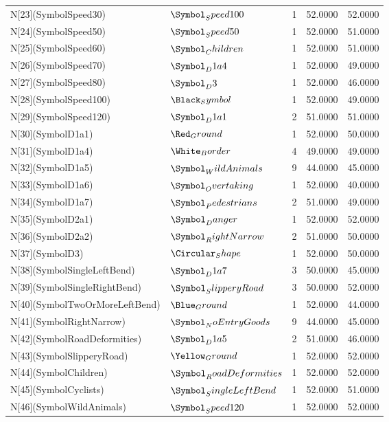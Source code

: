 \begin{tabular}{lllll}
N[23](SymbolSpeed30) & $\Symbol_Speed100$ & 1 & 52.0000 & 52.0000 \\
N[24](SymbolSpeed50) & $\Symbol_Speed50$ & 1 & 52.0000 & 51.0000 \\
N[25](SymbolSpeed60) & $\Symbol_Children$ & 1 & 52.0000 & 51.0000 \\
N[26](SymbolSpeed70) & $\Symbol_D1a4$ & 1 & 52.0000 & 49.0000 \\
N[27](SymbolSpeed80) & $\Symbol_D3$ & 1 & 52.0000 & 46.0000 \\
N[28](SymbolSpeed100) & $\Black_Symbol$ & 1 & 52.0000 & 49.0000 \\
N[29](SymbolSpeed120) & $\Symbol_D1a1$ & 2 & 51.0000 & 51.0000 \\
N[30](SymbolD1a1) & $\Red_Ground$ & 1 & 52.0000 & 50.0000 \\
N[31](SymbolD1a4) & $\White_Border$ & 4 & 49.0000 & 49.0000 \\
N[32](SymbolD1a5) & $\Symbol_WildAnimals$ & 9 & 44.0000 & 45.0000 \\
N[33](SymbolD1a6) & $\Symbol_Overtaking$ & 1 & 52.0000 & 40.0000 \\
N[34](SymbolD1a7) & $\Symbol_Pedestrians$ & 2 & 51.0000 & 49.0000 \\
N[35](SymbolD2a1) & $\Symbol_Danger$ & 1 & 52.0000 & 52.0000 \\
N[36](SymbolD2a2) & $\Symbol_RightNarrow$ & 2 & 51.0000 & 50.0000 \\
N[37](SymbolD3) & $\Circular_Shape$ & 1 & 52.0000 & 50.0000 \\
N[38](SymbolSingleLeftBend) & $\Symbol_D1a7$ & 3 & 50.0000 & 45.0000 \\
N[39](SymbolSingleRightBend) & $\Symbol_SlipperyRoad$ & 3 & 50.0000 & 52.0000 \\
N[40](SymbolTwoOrMoreLeftBend) & $\Blue_Ground$ & 1 & 52.0000 & 44.0000 \\
N[41](SymbolRightNarrow) & $\Symbol_NoEntryGoods$ & 9 & 44.0000 & 45.0000 \\
N[42](SymbolRoadDeformities) & $\Symbol_D1a5$ & 2 & 51.0000 & 46.0000 \\
N[43](SymbolSlipperyRoad) & $\Yellow_Ground$ & 1 & 52.0000 & 52.0000 \\
N[44](SymbolChildren) & $\Symbol_RoadDeformities$ & 1 & 52.0000 & 52.0000 \\
N[45](SymbolCyclists) & $\Symbol_SingleLeftBend$ & 1 & 52.0000 & 51.0000 \\
N[46](SymbolWildAnimals) & $\Symbol_Speed120$ & 1 & 52.0000 & 52.0000 \\

\end{tabular}
